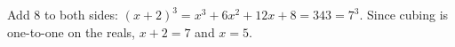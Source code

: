 Add $8$ to both sides: $(x+2)^3=x^3+6x^2+12x+8=343=7^3$. Since cubing is one-to-one on the reals, $x+2=7$ and $x=\boxed{5}$.
